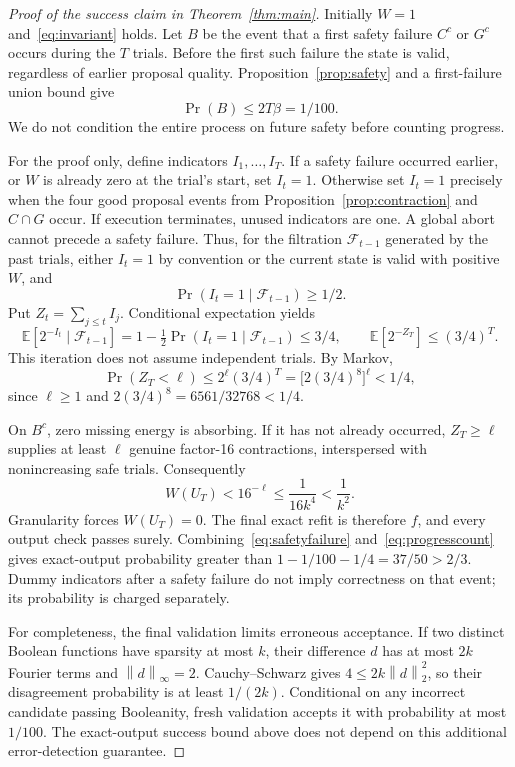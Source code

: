 \documentclass[11pt]{article}
\theoremstyle{remark}\newtheorem{remark}[theorem]{Remark}
\newcommand{\E}{\mathbb E}
\newcommand{\norm}[1]{\left\|#1\right\|}
\begin{document}
\begin{proof}[Proof of the success claim in Theorem~\ref{thm:main}]
Initially $W=1$ and~\eqref{eq:invariant} holds. Let $B$ be the event that a first safety failure $C^c$ or $G^c$ occurs during the $T$ trials. Before the first such failure the state is valid, regardless of earlier proposal quality. Proposition~\ref{prop:safety} and a first-failure union bound give
\begin{equation}\label{eq:safetyfailure}
 \Pr(B)\le2T\beta=1/100.
\end{equation}
We do not condition the entire process on future safety before counting progress.

For the proof only, define indicators $I_1,\ldots,I_T$. If a safety failure occurred earlier, or $W$ is already zero at the trial's start, set $I_t=1$. Otherwise set $I_t=1$ precisely when the four good proposal events from Proposition~\ref{prop:contraction} and $C\cap G$ occur. If execution terminates, unused indicators are one. A global abort cannot precede a safety failure. Thus, for the filtration $\mathcal F_{t-1}$ generated by the past trials, either $I_t=1$ by convention or the current state is valid with positive $W$, and
\[
 \Pr(I_t=1\mid\mathcal F_{t-1})\ge1/2.
\]
Put $Z_t=\sum_{j\le t}I_j$. Conditional expectation yields
\[
 \E[2^{-I_t}\mid\mathcal F_{t-1}]
 =1-\tfrac12\Pr(I_t=1\mid\mathcal F_{t-1})\le3/4,
 \qquad \E[2^{-Z_T}]\le(3/4)^T.
\]
This iteration does not assume independent trials. By Markov,
\begin{equation}\label{eq:progresscount}
 \Pr(Z_T<\ell)\le2^\ell(3/4)^T
 =\bigl[2(3/4)^8\bigr]^\ell<1/4,
\end{equation}
since $\ell\ge1$ and $2(3/4)^8=6561/32768<1/4$.

On $B^c$, zero missing energy is absorbing. If it has not already occurred, $Z_T\ge\ell$ supplies at least $\ell$ genuine factor-16 contractions, interspersed with nonincreasing safe trials. Consequently
\[
 W(U_T)<16^{-\ell}\le\frac1{16k^4}<\frac1{k^2}.
\]
Granularity forces $W(U_T)=0$. The final exact refit is therefore $f$, and every output check passes surely. Combining~\eqref{eq:safetyfailure} and~\eqref{eq:progresscount} gives exact-output probability greater than $1-1/100-1/4=37/50>2/3$. Dummy indicators after a safety failure do not imply correctness on that event; its probability is charged separately.

For completeness, the final validation limits erroneous acceptance. If two distinct Boolean functions have sparsity at most $k$, their difference $d$ has at most $2k$ Fourier terms and $\norm d_\infty=2$. Cauchy--Schwarz gives $4\le2k\norm d_2^2$, so their disagreement probability is at least $1/(2k)$. Conditional on any incorrect candidate passing Booleanity, fresh validation accepts it with probability at most $1/100$. The exact-output success bound above does not depend on this additional error-detection guarantee.
\end{proof}
\end{document}
